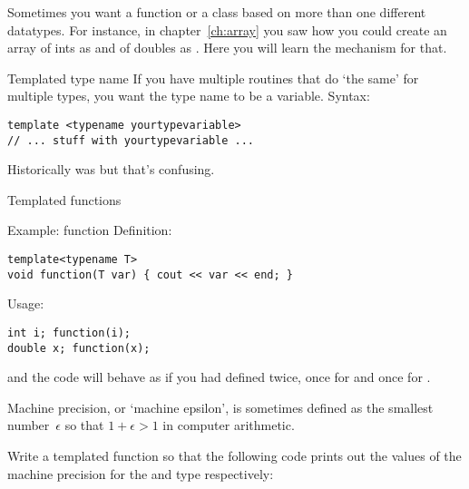 
Sometimes you want a function or a class based on more than one
different datatypes. For instance, in chapter~\ref{ch:array} you saw
how you could create an array of ints as  and
of doubles as . Here you will learn the mechanism
for that.

\begin{block}{Templated type name}
  \label{sl:template-gen}
  If you have multiple routines that do `the same' for multiple types,
  you want the type name to be a variable. Syntax:
\begin{verbatim}
template <typename yourtypevariable>
// ... stuff with yourtypevariable ...
\end{verbatim}
\end{block}

Historically  was  but that's confusing.

 {Templated functions}

\begin{block}{Example: function}
  \label{sl:template-fun}
  Definition:
\begin{verbatim}
template<typename T>
void function(T var) { cout << var << end; }
\end{verbatim}
Usage:
\begin{verbatim}
int i; function(i);
double x; function(x);
\end{verbatim}
and the code will behave as if you had defined  twice,
once for  and once for .
\end{block}

\begin{exercise}
  \label{ex:eps-template}
  Machine precision, or `machine epsilon', is sometimes defined as the
  smallest number~$\epsilon$ so that $1+\epsilon>1$ in computer
  arithmetic.

  Write a templated function  so that the following code
  prints out the values of the machine precision for the  and
   type respectively:
%
\end{exercise}

